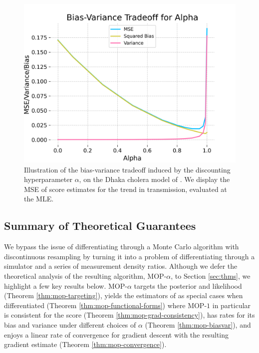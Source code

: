 \documentclass[9pt,twocolumn,twoside]{pnas-new}
\begin{document}
\begin{figure}[ht!]
    \centering
    \includegraphics[width=\textwidth/3]{imgs/095/biasvar.png}
    \caption{Illustration of the bias-variance tradeoff induced by the discounting hyperparameter $\alpha$, on the Dhaka cholera model of \cite{king08}. We display the MSE of score estimates for the trend in transmission, evaluated at the MLE.}
    \label{fig:biasvar}
\end{figure}

\subsection{Summary of Theoretical Guarantees}

We bypass the issue of differentiating through a Monte Carlo algorithm with discontinuous resampling by turning it into a problem of differentiating through a simulator and a series of measurement density ratios. Although we defer the theoretical analysis of the resulting algorithm, MOP-$\alpha$, to Section \ref{sec:thms}, we highlight a few key results below. MOP-$\alpha$ targets the posterior and likelihood (Theorem \ref{thm:mop-targeting}), yields the estimators of \cite{poyiadjis11, scibior21, blei2018vsmc} as special cases when differentiated (Theorem \ref{thm:mop-functional-forms}) where MOP-$1$ in particular is consistent for the score (Theorem \ref{thm:mop-grad-consistency}), has rates for its bias and variance under different choices of $\alpha$ (Theorem \ref{thm:mop-biasvar}), and enjoys a linear rate of convergence for gradient descent with the resulting gradient estimate (Theorem \ref{thm:mop-convergence}).  
\end{document}
